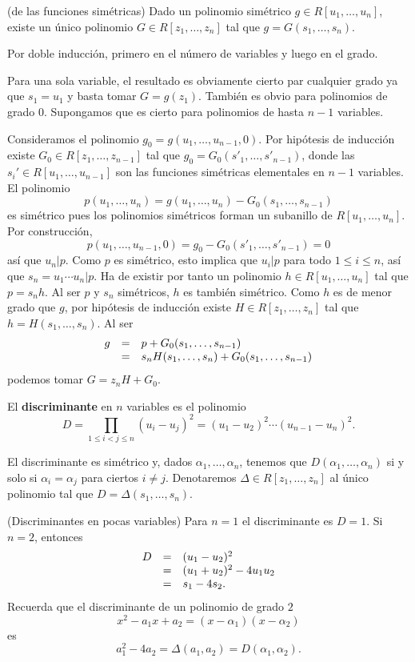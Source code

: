 \textrm{\normalfont (de las funciones simétricas)} Dado
un polinomio simétrico \(g\in R[u_1,\dots,u_n]\), existe un único
polinomio \(G\in R[z_1,\dots,z_n]\) tal que \(g=G(s_1,\dots,s_n)\).


Por doble inducción, primero en el número de variables y luego en el
grado.

Para una sola variable, el resultado es obviamente cierto par cualquier
grado ya que \(s_1=u_1\) y basta tomar \(G=g(z_1)\). También es obvio
para polinomios de grado \(0\). Supongamos que es cierto para polinomios
de hasta \(n-1\) variables.

Consideramos el polinomio \(g_0=g(u_1,\dots,u_{n-1},0)\). Por
hipótesis de inducción existe \(G_0\in R[z_1,\dots,z_{n-1}]\) tal que
\(g_0=G_0(s'_1,\dots,s'_{n-1})\), donde las
\(s_i'\in R[u_1,\dots,u_{n-1}]\) son las funciones simétricas
elementales en \(n-1\) variables. El polinomio
\[p(u_1,\dots,u_n)=g(u_1,\dots,u_n)-G_0(s_1,\dots,s_{n-1})\] es
simétrico pues los polinomios simétricos forman un subanillo de
\(R[u_1,\dots,u_n]\). Por construcción,
\[p(u_1,\dots,u_{n-1},0)=g_0-G_0(s'_1,\dots,s'_{n-1})=0\] así que
\(u_n|p\). Como \(p\) es simétrico, esto implica que \(u_i|p\) para
todo \(1\leq i\leq n\), así que \(s_n=u_1\cdots u_n|p\). Ha de
existir por tanto un polinomio \(h\in R[u_1,\dots,u_n]\) tal que
\(p=s_nh\). Al ser \(p\) y \(s_n\) simétricos, \(h\) es también
simétrico. Como \(h\) es de menor grado que \(g\), por hipótesis de
inducción existe \(H\in R[z_1,\dots,z_n]\) tal que
\(h=H(s_1,\dots,s_n)\). Al ser \[
\begin{array}{rcl}
g&=&p+G  _0(s_1,\dots,s_{n-1})\cr
&=&s_nH(s_1,\dots,s_n)+G_0(s_1,\dots,s_{n-1})
\end{array}\] podemos tomar \(G=z_nH+G_0\). 


El \textbf{discriminante} en \(n\) variables es el polinomio
\[D=\prod_{1\leq i<j\leq n}(u_i-u_j)^2=(u_1-u_2)^2\cdots(u_{n-1}-u_n)^2.\]


El discriminante es simétrico y, dados \(\alpha_1, \dots,\alpha_n\),
tenemos que \(D(\alpha_1, \dots,\alpha_n)\) si y solo si
\(\alpha_i=\alpha_j\) para ciertos \(i\neq j\). Denotaremos
\(\Delta\in R[z_1,\dots,z_n]\) al único polinomio tal que
\(D=\Delta(s_1,\dots,s_n)\). 

\textrm{\normalfont (Discriminantes en pocas variables)}
Para \(n=1\) el discriminante es \(D=1\). Si \(n=2\), entonces \[
\begin{array}{rcl}
D&=&(u_1-u_2)^2\cr
&=&(u_1+u_2)^2-4u_1u_2\cr
&=&s_1-4s_2.
\end{array}
\] Recuerda que el discriminante de un polinomio de grado \(2\)
\[x^2-a_1x+a_2=(x-\alpha_1)(x-\alpha_2)\] es
\[a_1^2-4a_2=\Delta(a_1,a_2)=D(\alpha_1,\alpha_2).\] 

